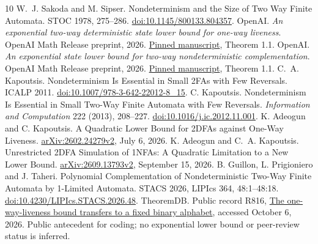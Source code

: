 \documentclass[11pt]{article}
\begin{document}
\clearpage
\begin{thebibliography}{10}
 W.~J. Sakoda and M. Sipser.
Nondeterminism and the Size of Two Way Finite Automata.
STOC 1978, 275--286. \href{https://doi.org/10.1145/800133.804357}{doi:10.1145/800133.804357}.
OpenAI. \emph{An exponential two-way deterministic state lower bound for
one-way liveness}. OpenAI Math Release preprint, 2026.
\href{https://github.com/openai/math/blob/adc7f1241b42e322a6451854ab7e4b4c146bf78a/preprints/An-exponential-two-way-deterministic-state-lower-bound-for-one-way-liveness-September-25-2026/main.pdf}{Pinned manuscript}, Theorem 1.1.
OpenAI. \emph{An exponential state lower bound for two-way nondeterministic
complementation}. OpenAI Math Release preprint, 2026.
\href{https://github.com/openai/math/blob/adc7f1241b42e322a6451854ab7e4b4c146bf78a/preprints/An-exponential-state-lower-bound-for-two-way-nondeterministic-complementation-September-25-2026/paper.pdf}{Pinned manuscript}, Theorem 1.1.
 C.~A. Kapoutsis. Nondeterminism Is Essential
in Small 2FAs with Few Reversals. ICALP 2011. \href{https://doi.org/10.1007/978-3-642-22012-8_15}{doi:10.1007/978-3-642-22012-8\_15}.
 C. Kapoutsis. Nondeterminism Is Essential in Small
Two-Way Finite Automata with Few Reversals. \emph{Information and Computation}
222 (2013), 208--227. \href{https://doi.org/10.1016/j.ic.2012.11.001}{doi:10.1016/j.ic.2012.11.001}.
 K. Adeogun and C. Kapoutsis.
A Quadratic Lower Bound for 2DFAs against One-Way Liveness.
\href{https://arxiv.org/abs/2602.24279v2}{arXiv:2602.24279v2}, July 6, 2026.
 K. Adeogun and C.~A. Kapoutsis.
Unrestricted 2DFA Simulation of 1NFAs: A Quadratic Limitation to a New Lower
Bound. \href{https://arxiv.org/abs/2609.13793v2}{arXiv:2609.13793v2}, September 15, 2026.
 B. Guillon, L. Prigioniero and J. Taheri.
Polynomial Complementation of Nondeterministic Two-Way Finite Automata by
1-Limited Automata. STACS 2026, LIPIcs 364, 48:1--48:18.
\href{https://doi.org/10.4230/LIPIcs.STACS.2026.48}{doi:10.4230/LIPIcs.STACS.2026.48}.
 TheoremDB. Public record R816,
\href{https://www.theoremdb.org/records/R816/}{The one-way-liveness bound transfers to a fixed binary alphabet},
accessed October 6, 2026. Public antecedent for coding; no exponential
lower bound or peer-review status is inferred.
\end{thebibliography}
\end{document}
